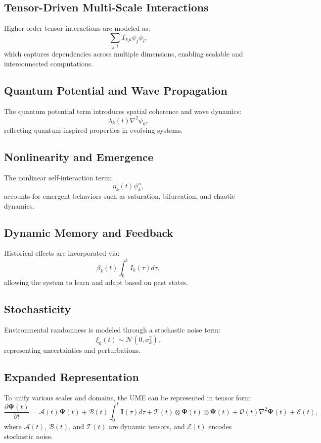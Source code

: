\documentclass{article}
\theoremstyle{plain}
\begin{document}
\subsection{Tensor-Driven Multi-Scale Interactions}
Higher-order tensor interactions are modeled as:
\begin{equation}
\sum_{j,l} T_{kjl} \psi_j \psi_l,
\end{equation}
which captures dependencies across multiple dimensions, enabling scalable and interconnected computations.

\subsection{Quantum Potential and Wave Propagation}
The quantum potential term introduces spatial coherence and wave dynamics:
\begin{equation}
\lambda_k(t) \nabla^2 \psi_k,
\end{equation}
reflecting quantum-inspired properties in evolving systems.

\subsection{Nonlinearity and Emergence}
The nonlinear self-interaction term:
\begin{equation}
\eta_k(t) \psi_k^n,
\end{equation}
accounts for emergent behaviors such as saturation, bifurcation, and chaotic dynamics.

\subsection{Dynamic Memory and Feedback}
Historical effects are incorporated via:
\begin{equation}
\beta_k(t) \int_0^t I_k(\tau) d\tau,
\end{equation}
allowing the system to learn and adapt based on past states.

\subsection{Stochasticity}
Environmental randomness is modeled through a stochastic noise term:
\begin{equation}
\xi_k(t) \sim \mathcal{N}(0, \sigma_k^2),
\end{equation}
representing uncertainties and perturbations.

\subsection{Expanded Representation}
To unify various scales and domains, the UME can be represented in tensor form:
\begin{equation}
\frac{\partial \bm{\Psi}(t)}{\partial t} = \mathcal{A}(t) \bm{\Psi}(t) + \mathcal{B}(t) \int_0^t \bm{I}(\tau) d\tau + \mathcal{T}(t) \otimes \bm{\Psi}(t) \otimes \bm{\Psi}(t) + \mathcal{Q}(t) \nabla^2 \bm{\Psi}(t) + \mathcal{E}(t),
\end{equation}
where $\mathcal{A}(t)$, $\mathcal{B}(t)$, and $\mathcal{T}(t)$ are dynamic tensors, and $\mathcal{E}(t)$ encodes stochastic noise.
\end{document}
